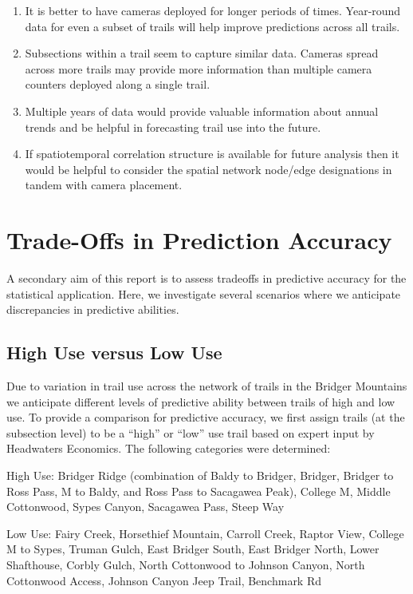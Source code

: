 \documentclass[
]{book}
\providecommand{\tightlist}{%
  \setlength{\itemsep}{0pt}\setlength{\parskip}{0pt}}
\begin{document}
\begin{enumerate}
\def\labelenumi{\arabic{enumi}.}
\tightlist
\item
  It is better to have cameras deployed for longer periods of times. Year-round data for even a subset of trails will help improve predictions across all trails.
\item
  Subsections within a trail seem to capture similar data. Cameras spread across more trails may provide more information than multiple camera counters deployed along a single trail.
\item
  Multiple years of data would provide valuable information about annual trends and be helpful in forecasting trail use into the future.
\item
  If spatiotemporal correlation structure is available for future analysis then it would be helpful to consider the spatial network node/edge designations in tandem with camera placement.
\end{enumerate}

\hypertarget{TradeOff}{%
\chapter{Trade-Offs in Prediction Accuracy}\label{TradeOff}}

A secondary aim of this report is to assess tradeoffs in predictive accuracy for the statistical application. Here, we investigate several scenarios where we anticipate discrepancies in predictive abilities.

\hypertarget{high-use-versus-low-use}{%
\section{High Use versus Low Use}\label{high-use-versus-low-use}}

Due to variation in trail use across the network of trails in the Bridger Mountains we anticipate different levels of predictive ability between trails of high and low use. To provide a comparison for predictive accuracy, we first assign trails (at the subsection level) to be a ``high'' or ``low'' use trail based on expert input by Headwaters Economics. The following categories were determined:

High Use: Bridger Ridge (combination of Baldy to Bridger, Bridger, Bridger to Ross Pass, M to Baldy, and Ross Pass to Sacagawea Peak), College M, Middle Cottonwood, Sypes Canyon, Sacagawea Pass, Steep Way

Low Use: Fairy Creek, Horsethief Mountain, Carroll Creek, Raptor View, College M to Sypes, Truman Gulch, East Bridger South, East Bridger North, Lower Shafthouse, Corbly Gulch, North Cottonwood to Johnson Canyon, North Cottonwood Access, Johnson Canyon Jeep Trail, Benchmark Rd
\end{document}
